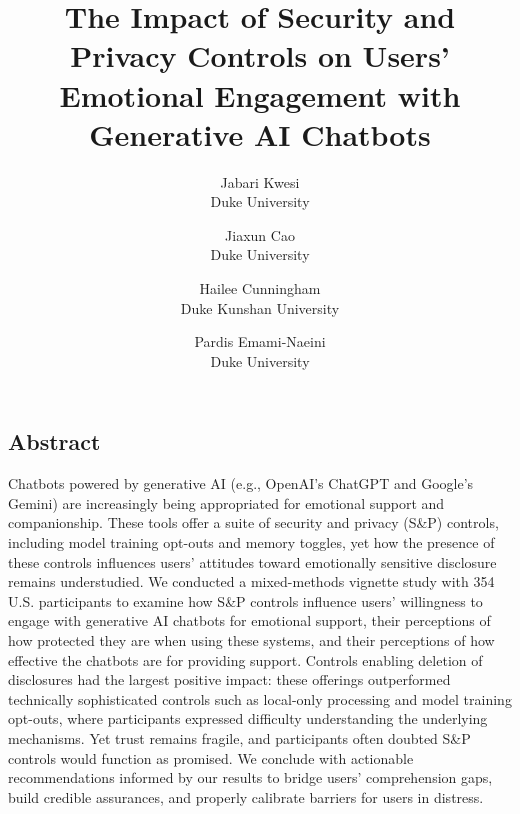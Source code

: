 \documentclass[letterpaper,twocolumn,10pt]{article}
\begin{document}
\date{}

\title{\Large \bf The Impact of Security and Privacy Controls on Users' Emotional Engagement with Generative AI Chatbots}

\pagestyle{empty}

\author{
{\rm Jabari Kwesi}\\
Duke University
\and
{\rm Jiaxun Cao}\\
Duke University
\and
{\rm Hailee Cunningham}\\
Duke Kunshan University
\and
{\rm Pardis Emami-Naeini}\\
Duke University
}

\maketitle

\subsection*{Abstract}

Chatbots powered by generative AI (e.g., OpenAI's ChatGPT and Google's Gemini) are increasingly being appropriated for emotional support and companionship. These tools offer a suite of security and privacy (S\&P) controls, including model training opt-outs and memory toggles, yet how the presence of these controls influences users' attitudes toward emotionally sensitive disclosure remains understudied. We conducted a mixed-methods vignette study with 354 U.S. participants to examine how S\&P controls influence users' willingness to engage with generative AI chatbots for emotional support, their perceptions of how protected they are when using these systems, and their perceptions of how effective the chatbots are for providing support. Controls enabling deletion of disclosures had the largest positive impact: these offerings outperformed technically sophisticated controls such as local-only processing and model training opt-outs, where participants expressed difficulty understanding the underlying mechanisms. Yet trust remains fragile, and participants often doubted S\&P controls would function as promised. We conclude with actionable recommendations informed by our results to bridge users' comprehension gaps, build credible assurances, and properly calibrate barriers for users in distress.
\end{document}
